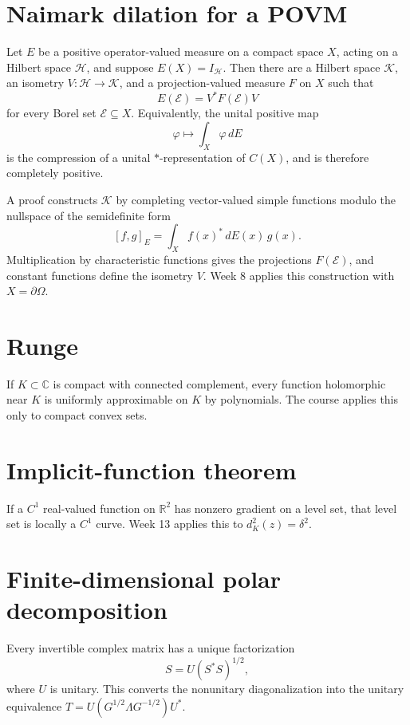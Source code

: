 \documentclass[11pt,oneside,openany]{book}
\theoremstyle{definition}
\theoremstyle{remark}
\newcommand{\C}{\mathbb C}
\newcommand{\R}{\mathbb R}
\begin{document}
\section{Naimark dilation for a POVM}

Let \(E\) be a positive operator-valued measure on a compact space
\(X\), acting on a Hilbert space \(\mathcal H\), and suppose
\(E(X)=I_{\mathcal H}\).  Then there are a Hilbert space
\(\mathcal K\), an isometry \(V:\mathcal H\to\mathcal K\), and a
projection-valued measure \(F\) on \(X\) such that
\[
  E(\mathcal E)=V^*F(\mathcal E)V
\]
for every Borel set \(\mathcal E\subseteq X\).  Equivalently, the
unital positive map
\[
  \varphi\longmapsto\int_X\varphi\,dE
\]
is the compression of a unital \(*\)-representation of \(C(X)\), and
is therefore completely positive.

A proof constructs \(\mathcal K\) by completing vector-valued simple
functions modulo the nullspace of the semidefinite form
\[
  [f,g]_E=\int_X f(x)^*\,dE(x)\,g(x).
\]
Multiplication by characteristic functions gives the projections
\(F(\mathcal E)\), and constant functions define the isometry \(V\).
Week 8 applies this construction with \(X=\partial\Omega\).

\section{Runge}

If \(K\subset\C\) is compact with connected complement, every function
holomorphic near \(K\) is uniformly approximable on \(K\) by
polynomials.  The course applies this only to compact convex sets.

\section{Implicit-function theorem}

If a \(C^1\) real-valued function on \(\R^2\) has nonzero gradient on a
level set, that level set is locally a \(C^1\) curve.  Week 13 applies
this to \(d_K^2(z)=\delta^2\).

\section{Finite-dimensional polar decomposition}

Every invertible complex matrix has a unique factorization
\[
  S=U(S^*S)^{1/2},
\]
where \(U\) is unitary.  This converts the nonunitary diagonalization
into the unitary equivalence
\(
T=U(G^{1/2}\Lambda G^{-1/2})U^*
\).
\end{document}

